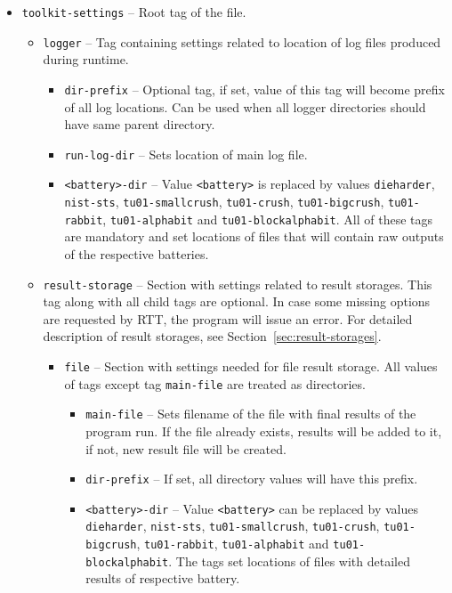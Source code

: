 \documentclass[
  digital,  	%
  color,		%
  oneside,   	%
  12pt,
  nocover,
  notable,
  nolof,
  nolot,
]{fithesis3}
\begin{document}
\begin{itemize}
\item \texttt{toolkit-settings} -- Root tag of the file.
\begin{itemize}
\item \texttt{logger} -- Tag containing settings related to location of log files produced during runtime. 
\begin{itemize}
\item \texttt{dir-prefix} -- Optional tag, if set, value of this tag will become prefix of all log locations. Can be used when all logger directories should have same parent directory.
\item \texttt{run-log-dir} -- Sets location of main log file.
\item \texttt{<battery>-dir} -- Value \texttt{<battery>} is replaced by values \texttt{dieharder}, \texttt{nist-sts}, \texttt{tu01-smallcrush}, \texttt{tu01-crush}, \texttt{tu01-bigcrush}, \texttt{tu01-rabbit}, \texttt{tu01-alphabit} and \texttt{tu01-blockalphabit}. All of these tags are mandatory and set locations of files that will contain raw outputs of the respective batteries.
\end{itemize}
\item \texttt{result-storage} -- Section with settings related to result storages. This tag along with all child tags are optional. In case some missing options are requested by RTT, the program will issue an error. For detailed description of result storages, see Section~\ref{sec:result-storages}.
\begin{itemize}
\item \texttt{file} -- Section with settings needed for file result storage. All values of tags except tag \texttt{main-file} are treated as directories.
\begin{itemize}
\item \texttt{main-file} -- Sets filename of the file with final results of the program run. If the file already exists, results will be added to it, if not, new result file will be created.
\item \texttt{dir-prefix} -- If set, all directory values will have this prefix.
\item \texttt{<battery>-dir} -- Value \texttt{<battery>} can be replaced by values \texttt{dieharder}, \texttt{nist-sts}, \texttt{tu01-smallcrush}, \texttt{tu01-crush}, \texttt{tu01-bigcrush}, \texttt{tu01-rabbit}, \texttt{tu01-alphabit} and \texttt{tu01-blockalphabit}. The tags set locations of files with detailed results of respective battery.

\end{itemize}
\end{itemize}
\end{itemize}
\end{itemize}
\end{document}
